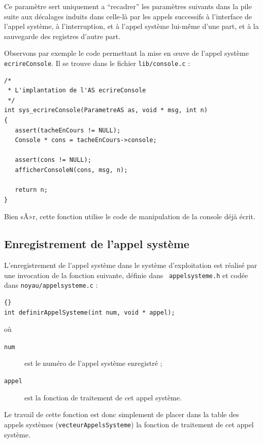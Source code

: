    Ce paramètre sert uniquement a ``recadrer'' les paramètres suivants 
dans la pile suite aux décalages induits dans celle-là par les appels
successifs à l'interface de l'appel système, à l'interruption, et à
l'appel système lui-même d'une part, et à la sauvegarde des registres
d'autre part.

   Observons par exemple le code permettant la mise en \oe{}uve de
l'appel système \lstinline!ecrireConsole!. Il se trouve dans le
fichier {\tt lib/console.c} :

\begin{lstlisting}
/*
 * L'implantation de l'AS ecrireConsole
 */
int sys_ecrireConsole(ParametreAS as, void * msg, int n)
{
   assert(tacheEnCours != NULL);
   Console * cons = tacheEnCours->console;
   
   assert(cons != NULL);
   afficherConsoleN(cons, msg, n);

   return n; 
}
\end{lstlisting}

   Bien sÃ»r, cette fonction utilise le code de manipulation de la
console déjà écrit.   

\subsection{Enregistrement de l'appel système}

   L'enregistrement de l'appel système dans le système d'exploitation est
réalisé par une invocation de la fonction suivante, définie dans {\tt
appelsysteme.h} et codée dans {\tt noyau/appelsysteme.c} :

\begin{lstlisting}{}
int definirAppelSysteme(int num, void * appel);
\end{lstlisting}

   où 

\begin{description}
   \item[\lstinline!num!] est le numéro de l'appel système enregistré ;
   \item[\lstinline!appel!] est la fonction de traitement de cet appel
système.
\end{description}

   Le travail de cette fonction est donc simplement de placer dans la
table des appels systèmes (\lstinline!vecteurAppelsSysteme!) la
fonction de traitement de cet appel système.

